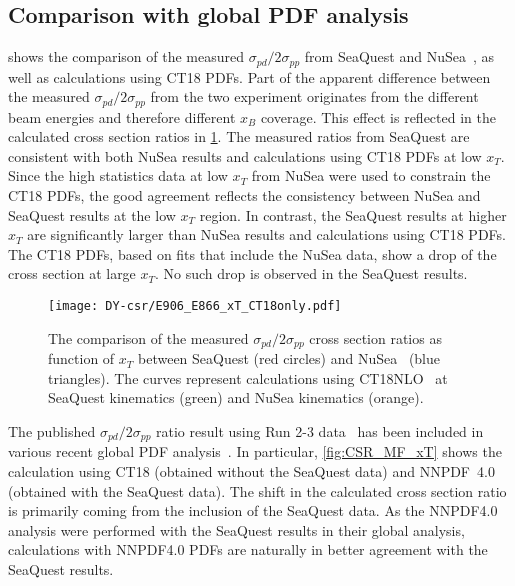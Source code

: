\documentclass[../main.tex]{subfiles}
\begin{document}
\subsection{Comparison with global PDF analysis}
 shows the comparison of the measured $\sigma_{pd}/2\sigma_{pp}$ from SeaQuest and NuSea~\cite{towell2001},
as well as calculations using CT18 PDFs. 
Part of the apparent difference between the measured $\sigma_{pd}/2\sigma_{pp}$ from the two experiment originates
from the different beam energies and therefore different $x_B$ coverage.
This effect is reflected in the calculated cross section ratios in \cref{fig:e866_e906}.
The measured ratios from SeaQuest are consistent with both NuSea results and calculations using CT18 PDFs
at low $x_T$. Since the high statistics data at low $x_T$ from NuSea were used to constrain
the CT18 PDFs, the good agreement reflects the consistency between NuSea and SeaQuest results
at the low $x_T$ region. 
In contrast, the SeaQuest results at higher $x_T$ are significantly larger than NuSea results and calculations using CT18 PDFs.
The CT18 PDFs, based on fits that include the NuSea data, show a drop of the cross section
at large $x_T$. No such drop is observed in the SeaQuest results.
\begin{figure}[htpb!]
	\centering
	\texttt{[image: DY-csr/E906\_E866\_xT\_CT18only.pdf]}
	\caption{The comparison of the measured $\sigma_{pd}/2\sigma_{pp}$ cross section ratios as function of $x_T$
		between SeaQuest (red circles) and NuSea~\cite{towell2001} (blue triangles).
		The curves represent calculations using CT18NLO~\cite{hou2021} at SeaQuest kinematics (green) and NuSea kinematics (orange).}
	\label{fig:e866_e906}
\end{figure} 

The published $\sigma_{pd}/2\sigma_{pp}$ ratio result using Run 2-3 data~\cite{dove2021,dove2023}
has been included in various recent global PDF analysis~\cite{cocuzza2021,guzzi2022,accardi2023,alekhin2023}.
In particular, \cref{fig:CSR_MF_xT} shows the calculation using CT18 (obtained without the SeaQuest data)
and NNPDF~4.0 (obtained with the SeaQuest data). The shift in the calculated cross section ratio is primarily
coming from the inclusion of the SeaQuest data.
As the NNPDF4.0 analysis were performed with the SeaQuest results in their global analysis,
calculations with NNPDF4.0 PDFs are naturally in better agreement with the SeaQuest results.
\end{document}
